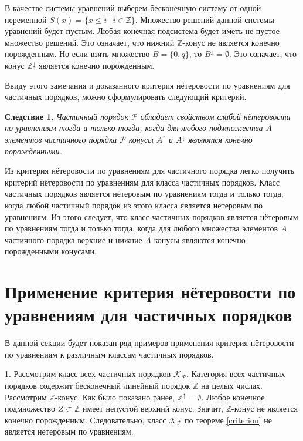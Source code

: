\documentclass[12pt]{article}
\theoremstyle{break}
\newtheorem{Con}{Следствие}
\def\P{\mathcal{P}}
\begin{document}
		В качестве системы уравнений выберем бесконечную систему от одной переменной $S(x) = \{x\leqslant i\ |\ i\in \mathbb{Z}\}.$ Множество решений данной системы уравнений будет пустым. Любая конечная подсистема будет иметь не пустое множество решений. Это означает, что нижний $\mathbb{Z}$-конус не является конечно порожденным. Но если взять множество $B = \{0, q\}$, то $B^{\downarrow} = \emptyset$. Это означает, что конус $\mathbb{Z}^{\downarrow}$ является конечно порожденным.

		Ввиду этого замечания и доказанного критерия нётеровости по уравнениям для частичных порядков, можно сформулировать следующий критерий.

		\begin{Con}
			Частичный порядок $\P$ обладает свойством слабой нётеровости по уравнениям тогда и только тогда, когда для любого подмножества $A$ элементов частичного порядка $\P$ конусы $A^{\uparrow}$ и $A^{\downarrow}$ являются конечно порожденными.
		\end{Con}

		Из критерия нётеровости по уравнениям для частичного порядка легко получить критерий нётеровости по уравнениям для класса частичных порядков. Класс частичных порядков является нётеровым по уравнениям тогда и только тогда, когда любой частичный порядок из этого класса является нётеровым по уравнениям. Из этого следует, что класс частичных порядков является нётеровым по уравнениям тогда и только тогда, когда для любого множества элементов $A$ частичного порядка верхние и нижние $A$-конусы являются конечно порожденными конусами.


	\section{Применение критерия нётеровости по уравнениям для частичных порядков}
		В данной секции будет показан ряд примеров применения критерия нётеровости по уравнениям к различным классам частичных порядков.

		1. Рассмотрим класс всех частичных порядков $\mathcal{K}_{\P}.$ Категория всех частичных порядков содержит бесконечный линейный порядок $\mathbb{Z}$ на целых числах. Рассмотрим $\mathbb{Z}$-конус. Как было показано ранее, $\mathbb{Z}^{\uparrow} = \emptyset$. Любое конечное подмножество $Z\subset\mathbb{Z}$ имеет непустой верхний конус. Значит, $\mathbb{Z}$-конус не является конечно порожденным. Следовательно, класс $\mathcal{K}_{\P}$ по теореме \ref{criterion} не является нётеровым по уравнениям.
\end{document}
